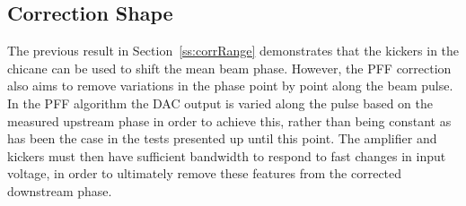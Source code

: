 %
%

\subsection{Correction Shape}
\label{ss:kickShape}

The previous result in Section~\ref{ss:corrRange} demonstrates that the kickers in the chicane can be used to shift the mean beam phase. However, the PFF correction also aims to remove variations in the phase point by point along the beam pulse. In the PFF algorithm the DAC output is varied along the pulse based on the measured upstream phase in order to achieve this, rather than being constant as has been the case in the tests presented up until this point. The amplifier and kickers must then have sufficient bandwidth to respond to fast changes in input voltage, in order to ultimately remove these features from the corrected downstream phase.

